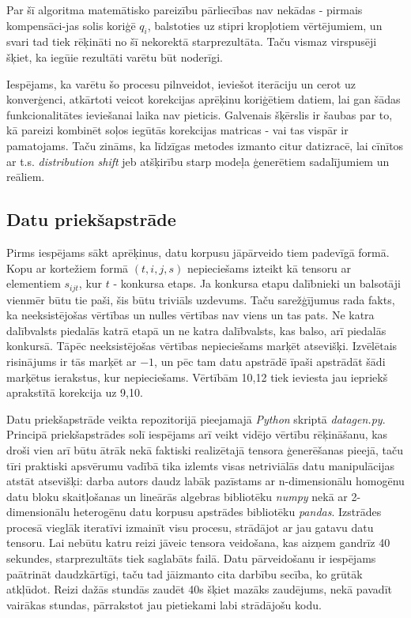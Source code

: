 \documentclass[12pt, a4paper]{article}
\begin{document}
Par šī algoritma matemātisko pareizību pārliecības nav nekādas - pirmais kompensāci-jas solis koriģē $q_i$, balstoties uz stipri kropļotiem vērtējumiem, un svari tad tiek rēķināti no šī nekorektā starprezultāta. Taču vismaz virspusēji šķiet, ka iegūie rezultāti varētu būt noderīgi. 

Iespējams, ka varētu šo procesu pilnveidot, ieviešot iterāciju un cerot uz konverģenci, atkārtoti veicot korekcijas aprēķinu koriģētiem datiem, lai gan šādas funkcionalitātes ieviešanai laika nav pieticis. Galvenais šķērslis ir šaubas par to, kā pareizi kombinēt soļos iegūtās korekcijas matricas - vai tas vispār ir pamatojams. Taču zināms, ka līdzīgas metodes izmanto citur datizracē, lai cīnītos ar t.s. \textit{distribution shift} jeb atšķirību starp modeļa ģenerētiem sadalījumiem un reāliem.

\subsection{Datu priekšapstrāde}

Pirms iespējams sākt aprēķinus, datu korpusu jāpārveido tiem padevīgā formā. Kopu ar kortežiem formā $(t,i,j,s)$ nepieciešams izteikt kā tensoru ar elementiem $s_{ijt}$, kur $t$ - konkursa etaps. Ja konkursa etapu dalībnieki un balsotāji vienmēr būtu tie paši, šis būtu triviāls uzdevums. Taču sarežģījumus rada fakts, ka neeksistējošas vērtības un nulles vērtības nav viens un tas pats. Ne katra dalībvalsts piedalās katrā etapā un ne katra dalībvalsts, kas balso, arī piedalās konkursā. Tāpēc neeksistējošas vērtības nepieciešams marķēt atsevišķi. Izvēlētais risinājums ir tās marķēt ar $-1$, un pēc tam datu apstrādē īpaši apstrādāt šādi marķētus ierakstus, kur nepieciešams. Vērtībām 10,12 tiek ieviesta jau iepriekš aprakstītā korekcija uz 9,10.

Datu priekšapstrāde veikta repozitorijā pieejamajā \textit{Python} skriptā \textit{datagen.py}. Principā priekšapstrādes solī iespējams arī veikt vidējo vērtību rēķināšanu, kas droši vien arī būtu ātrāk nekā faktiski realizētajā tensora ģenerēšanas pieejā, taču tīri praktiski apsvērumu vadībā tika izlemts visas netriviālās datu manipulācijas atstāt atsevišķi: darba autors daudz labāk pazīstams ar n-dimensionālu homogēnu datu bloku skaitļošanas un lineārās algebras bibliotēku \textit{numpy} nekā ar 2-dimensionālu heterogēnu datu korpusu apstrādes bibliotēku \textit{pandas}. Izstrādes procesā vieglāk iteratīvi izmainīt visu procesu, strādājot ar jau gatavu datu tensoru. Lai nebūtu katru reizi jāveic tensora veidošana, kas aizņem gandrīz 40 sekundes, starprezultāts tiek saglabāts failā. Datu pārveidošanu ir iespējams paātrināt daudzkārtīgi, taču tad jāizmanto cita darbību secība, ko grūtāk atkļūdot. Reizi dažās stundās zaudēt 40s šķiet mazāks zaudējums, nekā pavadīt vairākas stundas, pārrakstot jau pietiekami labi strādājošu kodu. 
\end{document}

